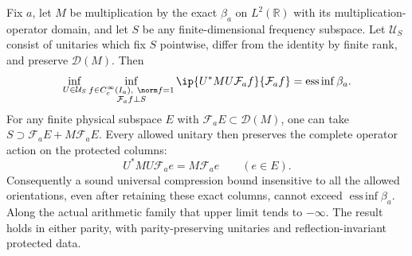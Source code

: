 \begin{theorem}
\label{thm:v139-protected-orbit}
Fix $a$, let $M$ be multiplication by the exact $\beta_a$ on
$L^2(\mathbb R)$ with its multiplication-operator domain, and let
$S$ be any finite-dimensional frequency subspace. Let $\mathcal U_S$
consist of unitaries which fix $S$ pointwise, differ from the identity
by finite rank, and preserve $\mathcal D(M)$. Then
\begin{equation}\label{eq:v139-orbit-edge}
 \inf_{U\in\mathcal U_S}
 \inf_{\substack{f\in C_c^\infty(I_a),\ \norm f=1\\
                 \mathcal F_af\perp S}}
 \ip{U^*MU\mathcal F_af}{\mathcal F_af}
       =\operatorname*{ess\,inf}\beta_a.
\end{equation}
For any finite physical subspace $E$ with
$\mathcal F_aE\subset\mathcal D(M)$, one can take
$S\supset\mathcal F_aE+M\mathcal F_aE$. Every allowed unitary then
preserves the complete operator action on the protected columns:
\begin{equation}\label{eq:v139-protected-columns}
 U^*MU\mathcal F_ae=M\mathcal F_ae\qquad(e\in E).
\end{equation}
Consequently a sound universal compression bound insensitive to all
the allowed orientations, even after retaining these exact columns,
cannot exceed $\operatorname*{ess\,inf}\beta_a$. Along the actual
arithmetic family that upper limit tends to $-\infty$.
The result holds in either parity, with parity-preserving unitaries
and reflection-invariant protected data.
\end{theorem}
